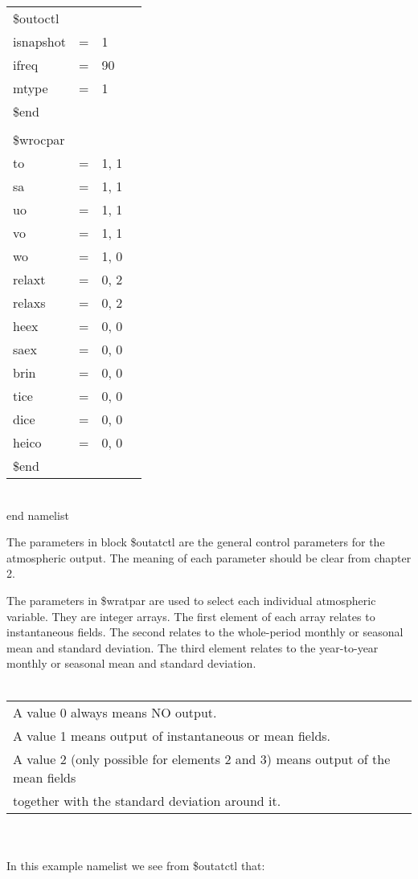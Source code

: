 \newpage
\begin{tabular}{llll}
                         \\ 
\$outoctl&               \\
  isnapshot &   = & 1    \\
  ifreq     &   = & 90   \\
  mtype     &   = & 1    \\
\$end                    \\
                         \\
\$wrocpar        \\
 to      &  = & 1,  1 \\
 sa      &  = & 1,  1 \\
 uo      &  = & 1,  1 \\
 vo      &  = & 1,  1 \\
 wo      &  = & 1,  0 \\
 relaxt  &  = & 0,  2 \\
 relaxs  &  = & 0,  2 \\
 heex    &  = & 0,  0 \\
 saex    &  = & 0,  0 \\
 brin    &  = & 0,  0 \\
 tice    &  = & 0,  0 \\
 dice    &  = & 0,  0 \\
 heico   &  = & 0,  0 \\
\$end  
\end{tabular}
\\
end namelist
\baselineskip=18pt

The parameters in block \$outatctl are the general control parameters for the atmospheric output. 
The meaning of each parameter should be clear from chapter 2.

The parameters in \$wratpar are used to select each individual atmospheric variable. They are integer
arrays. The first element of each array relates to instantaneous fields. The second 
relates to the whole-period monthly or seasonal mean and standard deviation. The third element 
relates to the year-to-year monthly or seasonal mean and standard deviation.\\
\\
\begin{tabular}{ll}
  A value 0 always means NO output.  \\ 
  A value 1 means output of instantaneous or mean fields. \\  
  A value 2 (only possible for elements 2 and 3) means output of the mean fields \\
together with the standard deviation around it.
\end{tabular}
\\
\\
In this example namelist we see from \$outatctl that:

